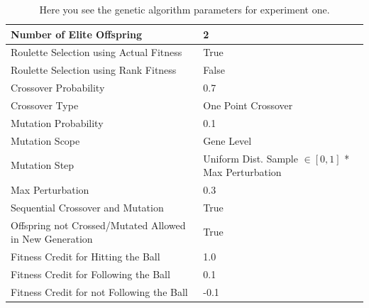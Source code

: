 \documentclass[a4paper,10pt]{article}
\begin{document}
\begin{table}[H]
\footnotesize
\begin{tabular}{ >{\columncolor[gray]{0.8}} l | l }
\hline
Number of Elite Offspring                                            & 2                                                         \\ \hline
Roulette Selection using Actual Fitness                              & True                                                      \\ \hline
Roulette Selection using Rank Fitness                                & False                                                     \\ \hline
Crossover Probability                                                & 0.7                                                       \\ \hline
Crossover Type                                                       & One Point Crossover                                       \\ \hline
Mutation Probability                                                 & 0.1                                                       \\ \hline
Mutation Scope                                                       & Gene Level                                                \\ \hline
Mutation Step                                                        & Uniform Dist. Sample $\in[0,1]$ * Max Perturbation        \\ \hline
Max Perturbation                                                     & 0.3                                                       \\ \hline
Sequential Crossover and Mutation                                    & True                                                      \\ \hline
Offspring not Crossed/Mutated Allowed in New Generation              & True                                                      \\ \hline
Fitness Credit for Hitting the Ball                                  & 1.0                                                       \\ \hline
Fitness Credit for Following the Ball                                & 0.1                                                       \\ \hline
Fitness Credit for not Following the Ball                            & -0.1                                                      \\ \hline
\end{tabular}
\caption{Here you see the genetic algorithm parameters for experiment one.}
\label{tab:exp1}
\end{table}
\end{document}

